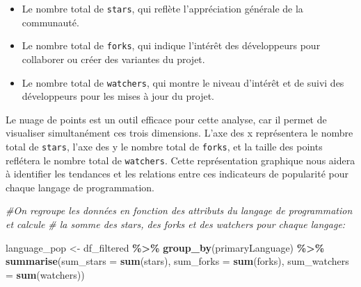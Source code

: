 \documentclass[
]{article}
\newenvironment{Shaded}{\begin{snugshade}}{\end{snugshade}}
\newcommand{\AttributeTok}[1]{\textcolor[rgb]{0.13,0.29,0.53}{#1}}
\newcommand{\CommentTok}[1]{\textcolor[rgb]{0.56,0.35,0.01}{\textit{#1}}}
\newcommand{\FunctionTok}[1]{\textcolor[rgb]{0.13,0.29,0.53}{\textbf{#1}}}
\newcommand{\NormalTok}[1]{#1}
\newcommand{\OtherTok}[1]{\textcolor[rgb]{0.56,0.35,0.01}{#1}}
\newcommand{\SpecialCharTok}[1]{\textcolor[rgb]{0.81,0.36,0.00}{\textbf{#1}}}
\providecommand{\tightlist}{%
  \setlength{\itemsep}{0pt}\setlength{\parskip}{0pt}}
\begin{document}
\begin{itemize}
\tightlist
\item
  Le nombre total de \texttt{stars}, qui reflète l'appréciation générale
  de la communauté.
\item
  Le nombre total de \texttt{forks}, qui indique l'intérêt des
  développeurs pour collaborer ou créer des variantes du projet.
\item
  Le nombre total de \texttt{watchers}, qui montre le niveau d'intérêt
  et de suivi des développeurs pour les mises à jour du projet.
\end{itemize}

Le nuage de points est un outil efficace pour cette analyse, car il
permet de visualiser simultanément ces trois dimensions. L'axe des x
représentera le nombre total de \texttt{stars}, l'axe des y le nombre
total de \texttt{forks}, et la taille des points reflétera le nombre
total de \texttt{watchers}. Cette représentation graphique nous aidera à
identifier les tendances et les relations entre ces indicateurs de
popularité pour chaque langage de programmation.

\begin{Shaded}
\begin{Highlighting}[]
\CommentTok{\#On regroupe les données en fonction des attributs du langage de programmation et calcule }
\CommentTok{\# la somme des \textasciigrave{}stars\textasciigrave{}, des \textasciigrave{}forks\textasciigrave{} et des \textasciigrave{}watchers\textasciigrave{} pour chaque langage:}

\NormalTok{language\_pop }\OtherTok{\textless{}{-}}\NormalTok{ df\_filtered }\SpecialCharTok{\%\textgreater{}\%}
  \FunctionTok{group\_by}\NormalTok{(primaryLanguage) }\SpecialCharTok{\%\textgreater{}\%}
  \FunctionTok{summarise}\NormalTok{(}\AttributeTok{sum\_stars =} \FunctionTok{sum}\NormalTok{(stars),}
            \AttributeTok{sum\_forks =} \FunctionTok{sum}\NormalTok{(forks),}
            \AttributeTok{sum\_watchers =} \FunctionTok{sum}\NormalTok{(watchers))}
\end{Highlighting}
\end{Shaded}
\end{document}
